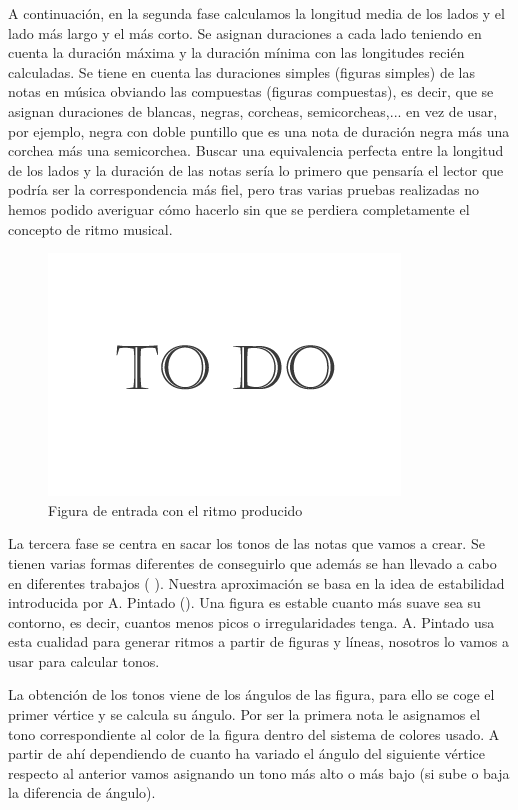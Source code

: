 A continuación, en la segunda fase calculamos la longitud media de los lados y el lado más largo y el más corto. Se asignan duraciones a cada lado teniendo en cuenta la duración máxima y la duración mínima con las longitudes recién calculadas. Se tiene en cuenta las duraciones simples (figuras simples) de las notas en música obviando las compuestas (figuras compuestas), es decir, que se asignan duraciones de blancas, negras, corcheas, semicorcheas,... en vez de usar, por ejemplo, negra con doble puntillo que es una nota de duración negra más una corchea más una semicorchea. Buscar una equivalencia perfecta entre la longitud de los lados y la duración de las notas sería lo primero que pensaría el lector que podría ser la correspondencia más fiel, pero tras varias pruebas realizadas no hemos podido averiguar cómo hacerlo sin que se perdiera completamente el concepto de ritmo musical.

		\begin{figure}[htbp]
		\centering
		\hspace*{0.0in}
		\includegraphics[scale=0.57]{graphics/todo.png}
		\caption{Figura de entrada con el ritmo producido}
		\label{fig:Figura2Voz1}
		\end{figure}

La tercera fase se centra en sacar los tonos de las notas que vamos a crear. Se tienen varias formas diferentes de conseguirlo que además se han llevado a cabo en diferentes trabajos (\cite{bricksConvertsMusic} \cite{ImageBaseComposition}). Nuestra aproximación se basa en la idea de estabilidad introducida por A. Pintado (\cite{portutesis}). Una figura es estable cuanto más suave sea su contorno, es decir, cuantos menos picos o irregularidades tenga. A. Pintado usa esta cualidad para generar ritmos a partir de figuras y líneas, nosotros lo vamos a usar para calcular tonos.

La obtención de los tonos viene de los ángulos de las figura, para ello se coge el primer vértice y se calcula su ángulo. Por ser la primera nota le asignamos el tono correspondiente al color de la figura dentro del sistema de colores usado. A partir de ahí dependiendo de cuanto ha variado el ángulo del siguiente vértice respecto al anterior vamos asignando un tono más alto o más bajo (si sube o baja la diferencia de ángulo).

